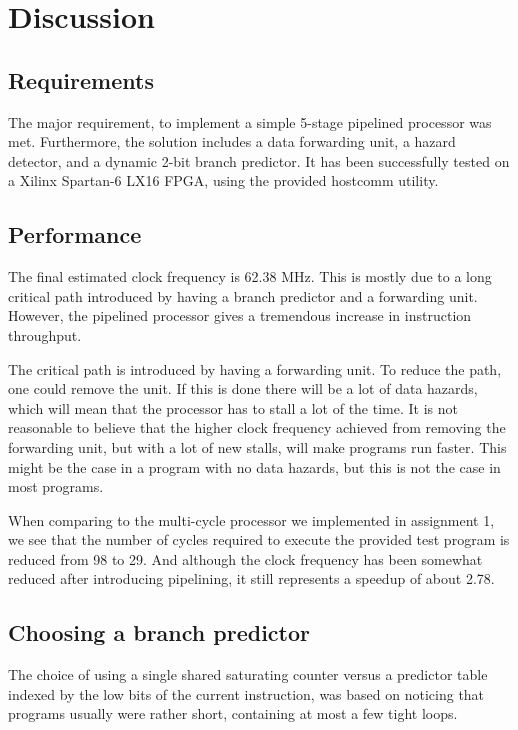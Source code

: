 \chapter{Discussion}

\section{Requirements}
The major requirement, to implement a simple 5-stage pipelined processor was met.
Furthermore, the solution includes a data forwarding unit, a hazard detector, and a dynamic 2-bit branch predictor.
It has been successfully tested on a Xilinx Spartan-6 LX16 FPGA, using the provided hostcomm\cite{hostcomm} utility.

\section{Performance}

The final estimated clock frequency is 62.38 MHz.
This is mostly due to a long critical path introduced by having a branch predictor and a forwarding unit.
However, the pipelined processor gives a tremendous increase in instruction throughput.

The critical path is introduced by having a forwarding unit.
To reduce the path, one could remove the unit.
If this is done there will be a lot of data hazards, which will mean that the processor has to stall a lot of the time.
It is not reasonable to believe that the higher clock frequency achieved from removing the forwarding unit, but with a lot of new stalls, will make programs run faster.
This might be the case in a program with no data hazards, but this is not the case in most programs.

When comparing to the multi-cycle processor we implemented in assignment 1, we see that the number of cycles required to execute the provided test program is reduced from 98 to 29.
And although the clock frequency has been somewhat reduced after introducing pipelining, it still represents a speedup of about 2.78.


\section{Choosing a branch predictor}
The choice of using a single shared saturating counter versus a predictor table indexed by the low bits of the current instruction, was based on noticing that programs usually were rather short, containing at most a few tight loops.

